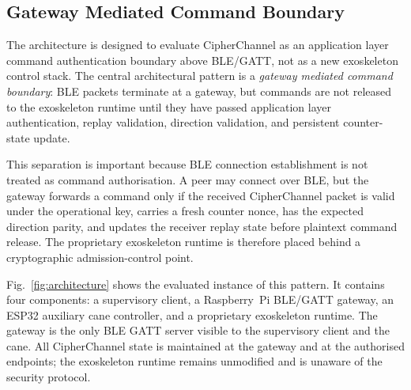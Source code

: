 \documentclass[journal]{IEEEtran}
\begin{document}
\subsection{Gateway Mediated Command Boundary}

The architecture is designed to evaluate CipherChannel as an application layer command authentication boundary above BLE/GATT, not as a new exoskeleton control stack. The central architectural pattern is a \emph{gateway mediated command boundary}: BLE packets terminate at a gateway, but commands are not released to the exoskeleton runtime until they have passed application layer authentication, replay validation, direction validation, and persistent counter-state update.

This separation is important because BLE connection establishment is not treated as command authorisation. A peer may connect over BLE, but the gateway forwards a command only if the received CipherChannel packet is valid under the operational key, carries a fresh counter nonce, has the expected direction parity, and updates the receiver replay state before plaintext command release. The proprietary exoskeleton runtime is therefore placed behind a cryptographic admission-control point.

Fig.~\ref{fig:architecture} shows the evaluated instance of this pattern. It contains four components: a supervisory client, a Raspberry~Pi BLE/GATT gateway, an ESP32 auxiliary cane controller, and a proprietary exoskeleton runtime. The gateway is the only BLE GATT server visible to the supervisory client and the cane. All CipherChannel state is maintained at the gateway and at the authorised endpoints; the exoskeleton runtime remains unmodified and is unaware of the security protocol.
\end{document}

